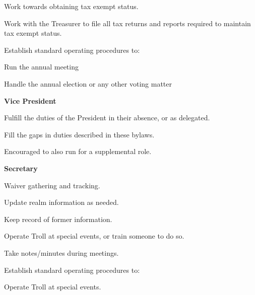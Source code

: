 \documentclass[12pt]{article}
\begin{document}
\begin{level}
\begin{level}
\begin{level}
            \item Work towards obtaining tax exempt status.
            \item Work with the Treasurer to file all tax returns and reports required to maintain tax exempt status.
            \item Establish standard operating procedures to:
            \begin{level}
                \item Run the annual meeting
                \item Handle the annual election or any other voting matter
            \end{level}
        \end{level}
        \item \textbf{Vice President}
        \begin{level}
            \item Fulfill the duties of the President in their absence, or as delegated.
            \item Fill the gaps in duties described in these bylaws.
            \item Encouraged to also run for a supplemental role.
        \end{level}
        \item \textbf{Secretary}
        \begin{level}
            \item Waiver gathering and tracking.
            \item Update realm information as needed.
            \item Keep record of former information.
            \item Operate Troll at special events, or train someone to do so.
            \begin{level}
                \item {}
            \end{level}
            \item Take notes/minutes during meetings.
            \item {}
            \item Establish standard operating procedures to:
            \begin{level}
                \item Operate Troll at special events.
            \end{level}

\end{level}
\end{level}
\end{level}
\end{document}
